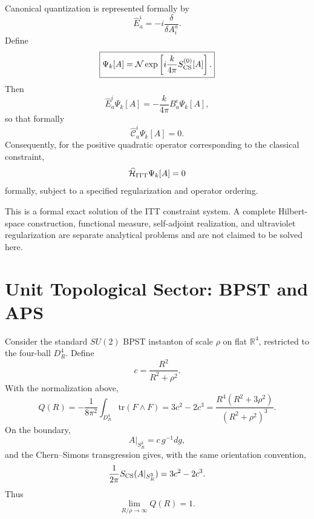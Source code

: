 \documentclass[11pt,a4paper]{article}
\begin{document}
Canonical quantization is represented formally\cite{Witten1989} by
\begin{equation}
\widehat E_a^i
=-i\frac{\delta}{\delta A_i^a}.
\end{equation}
Define
\begin{equation}
\boxed{
\Psi_k[A]
=
\mathcal N
\exp\left[
 i\frac{k}{4\pi}S_{\rm CS}^{(0)}[A]
\right].
}
\end{equation}
Then
\begin{equation}
\widehat E_a^i\Psi_k[A]
=-\frac{k}{4\pi}B_a^i\Psi_k[A],
\end{equation}
so that formally
\begin{equation}
\boxed{
\widehat{\mathcal C}_a^i\Psi_k[A]=0.
}
\end{equation}
Consequently, for the positive quadratic operator corresponding to the classical constraint,
\begin{equation}
\widehat{\mathcal H}_{\rm ITT}\Psi_k[A]=0
\end{equation}
formally, subject to a specified regularization and operator ordering.

This is a formal exact solution of the ITT constraint system. A complete Hilbert-space construction, functional measure, self-adjoint realization, and ultraviolet regularization are separate analytical problems and are not claimed to be solved here.

\section{Unit Topological Sector: BPST and APS}

Consider the standard $SU(2)$ BPST instanton of scale $\rho$ on flat $\mathbb R^4$, restricted to the four-ball $D_R^4$\cite{BPST1975}. Define
\begin{equation}
c=\frac{R^2}{R^2+\rho^2}.
\end{equation}
With the normalization above,
\begin{equation}
Q(R)
=-\frac{1}{8\pi^2}
\int_{D_R^4}\mathrm{tr}(F\wedge F)
=
3c^2-2c^3
=
\frac{R^4(R^2+3\rho^2)}{(R^2+\rho^2)^3}.
\end{equation}
On the boundary,
\begin{equation}
A|_{S^3_R}=c\,g^{-1}dg,
\end{equation}
and the Chern--Simons transgression gives, with the same orientation convention,
\begin{equation}
\frac{1}{2\pi}S_{\rm CS}(A|_{S^3_R})=3c^2-2c^3.
\end{equation}
Thus
\begin{equation}
\lim_{R/\rho\to\infty}Q(R)=1.
\end{equation}
\end{document}
